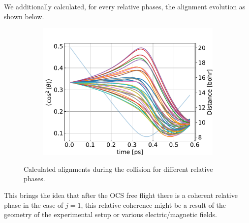 \documentclass{article}
\begin{document}
    We additionally calculated, for every relative phases, the alignment evolution as shown below. 
    \begin{figure}[H]
        \centering
        \begin{subfigure}{.7\linewidth}
            \centering
            \includegraphics[width=\linewidth]{alignments_coriolis_phases.pdf}
        \end{subfigure} 
        \caption{Calculated alignments during the collision for different relative phases.}
    \end{figure}

    This brings the idea that after the OCS free flight there is a coherent relative phase in the case of $j = 1$,
    this relative coherence might be a result of the geometry of the experimental setup or various electric/magnetic fields.
\end{document}
